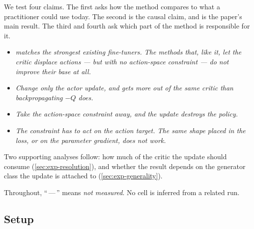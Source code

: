 %

We test four claims. The first asks how the method compares to what a
practitioner could use today. The second is the causal claim, and is the
paper's main result. The third and fourth ask which part of the method is
responsible for it.

\begin{itemize}
  \item[\textbf{H1}] \emph{\method{} matches the strongest existing
  fine-tuners. The methods that, like it, let the critic \emph{displace}
  actions --- but with no action-space constraint --- do not improve their
  base at all.}
  \item[\textbf{H2}] \emph{Change only the actor update, and \method{} gets
  more out of the same critic than backpropagating $-Q$ does.}
  \item[\textbf{H3}] \emph{Take the action-space constraint away, and the
  update destroys the policy.}
  \item[\textbf{H4}] \emph{The constraint has to act on the action target.
  The same shape placed in the loss, or on the parameter gradient, does not
  work.}
\end{itemize}

Two supporting analyses follow: how much of the critic the update should
consume (\cref{sec:exp-resolution}), and whether the result depends on the
generator class the update is attached to (\cref{sec:exp-generality}).

Throughout, ``\,---\,'' means \emph{not measured}. No cell is inferred from a
related run.

\subsection{Setup}
\label{sec:exp-setup}

